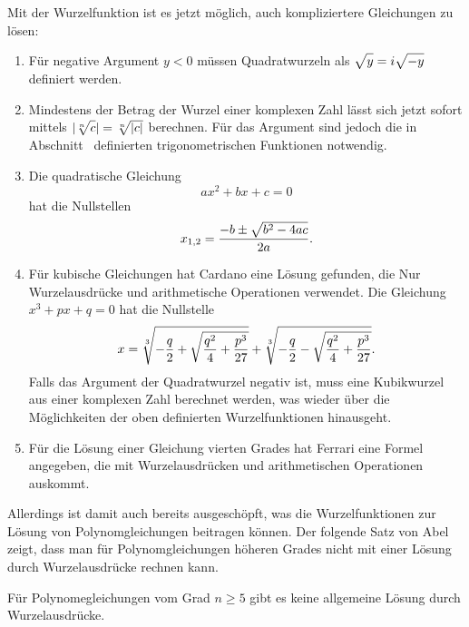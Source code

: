 Mit der Wurzelfunktion ist es jetzt möglich, auch kompliziertere
Gleichungen zu lösen:
\begin{enumerate}
\item
Für negative Argument $y<0$ müssen Quadratwurzeln als
$\sqrt{y\mathstrut}=i\sqrt{-y\mathstrut}$ definiert werden.
\item
Mindestens der Betrag der Wurzel einer komplexen Zahl lässt
sich jetzt sofort mittels $|\root{n}\of{c\mathstrut}|=\root{n}\of{|c|\mathstrut}$
berechnen.
Für das Argument sind jedoch die in
Abschnitt~\label{buch:geometrie:section:trigonometrisch} definierten
trigonometrischen Funktionen notwendig.
\item
Die quadratische Gleichung 
\[
ax^2+bx+c=0
\]
hat die Nullstellen
\[
x_{1,2} = \frac{-b\pm\sqrt{b^2-4ac\mathstrut}}{2a}.
\]
\item
Für kubische Gleichungen hat Cardano eine Lösung gefunden, die
Nur Wurzelausdrücke und arithmetische Operationen verwendet.
Die Gleichung $x^3+px+q=0$ hat die Nullstelle
\[
x
=
\root{3}\of{-\frac{q}2+\sqrt{\frac{q^2}4+\frac{p^3}{27}}}
+
\root{3}\of{-\frac{q}2-\sqrt{\frac{q^2}4+\frac{p^3}{27}}}.
\]
Falls das Argument der Quadratwurzel negativ ist, muss eine
Kubikwurzel aus einer komplexen Zahl berechnet werden, was
wieder über die Möglichkeiten der oben definierten Wurzelfunktionen
hinausgeht.
\item
Für die Lösung einer Gleichung vierten Grades hat Ferrari eine
Formel angegeben, die mit Wurzelausdrücken und arithmetischen
Operationen auskommt.
\end{enumerate}

Allerdings ist damit auch bereits ausgeschöpft, was die
Wurzelfunktionen zur Lösung von Polynomgleichungen beitragen
können.
Der folgende Satz von Abel zeigt, dass man für Polynomgleichungen
höheren Grades nicht mit einer Lösung durch Wurzelausdrücke
rechnen kann.

\begin{satz}[Abel]
\label{buch:potenzen:satz:abel}
Für Polynomegleichungen vom Grad $n\ge 5$ gibt es keine allgemeine
Lösung durch Wurzelausdrücke.
\end{satz}

